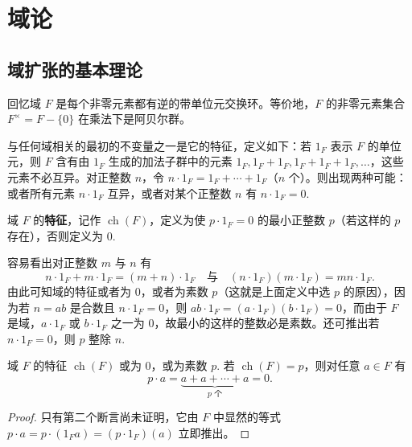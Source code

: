 
\setcounter{chapter}{12}

\chapter{域论}

\section{域扩张的基本理论}

回忆域 \(F\) 是每个非零元素都有逆的带单位元交换环。等价地，\(F\) 的非零元素集合 \(F^\times = F-\{0\}\) 在乘法下是阿贝尔群。

与任何域相关的最初的不变量之一是它的特征，定义如下：若 \(1_F\) 表示 \(F\) 的单位元，则 \(F\) 含有由 \(1_F\) 生成的加法子群中的元素 \(1_F, 1_F+1_F, 1_F+1_F+1_F, \ldots\)，这些元素不必互异。对正整数 \(n\)，令 \(n \cdot 1_F = 1_F+\cdots+1_F\)（\(n\) 个）。则出现两种可能：或者所有元素 \(n \cdot 1_F\) 互异，或者对某个正整数 \(n\) 有 \(n \cdot 1_F = 0\).

\begin{definition}
域 \(F\) 的\textbf{特征}，记作 \(\operatorname{ch}(F)\)，定义为使 \(p \cdot 1_F = 0\) 的最小正整数 \(p\)（若这样的 \(p\) 存在），否则定义为 0.
\end{definition}

容易看出对正整数 \(m\) 与 \(n\) 有
\begin{equation}
n \cdot 1_F+m \cdot 1_F = (m+n) \cdot 1_F \quad \text{与} \quad (n \cdot 1_F)(m \cdot 1_F) = mn \cdot 1_F. \tag{13.1}
\end{equation}
由此可知域的特征或者为 0，或者为素数 \(p\)（这就是上面定义中选 \(p\) 的原因），因为若 \(n = ab\) 是合数且 \(n \cdot 1_F = 0\)，则 \(ab \cdot 1_F = (a \cdot 1_F)(b \cdot 1_F) = 0\)，而由于 \(F\) 是域，\(a \cdot 1_F\) 或 \(b \cdot 1_F\) 之一为 0，故最小的这样的整数必是素数。还可推出若 \(n \cdot 1_F = 0\)，则 \(p\) 整除 \(n\).

\begin{proposition}\label{pro:13.1}
域 \(F\) 的特征 \(\operatorname{ch}(F)\) 或为 0，或为素数 \(p\). 若 \(\operatorname{ch}(F) = p\)，则对任意 \(a \in F\) 有
\[
p \cdot a = \underbrace{a+a+\cdots+a}_{p \text{ 个}} = 0.
\]
\end{proposition}

\begin{proof}
只有第二个断言尚未证明，它由 \(F\) 中显然的等式 \(p \cdot a = p \cdot (1_Fa) = (p \cdot 1_F)(a)\) 立即推出。
\end{proof}

